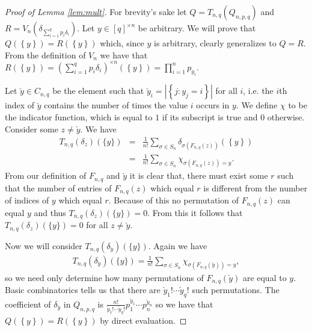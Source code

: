 \documentclass[aos,preprint]{imsart}
\def\l{\left}
\def\r{\right}
\theoremstyle{plain}
\theoremstyle{defintion}
\begin{document}
\begin{proof}[Proof of Lemma \ref{lem:mult}]
	For brevity's sake let $Q =T_{n,q}\left( Q_{n,p,q} \right)$ and  $R= V_n\left( \delta_{\sum_{i=1}^q p_i \delta_i} \right)$. Let $y \in \left[ q \right]^{\times n}$ be arbitrary. We will prove that $Q(\l\{y\r\}) = R(\l\{y\r\})$ which, since $y$ is arbitrary, clearly generalizes to $Q=R$. From the definition of $V_n$ we have that $R(\l\{y\r\}) = \left( \sum_{i=1}^q p_i \delta_i \right)^{\times n} \left( \left\{ y \right\} \right) = \prod_{i=1}^n p_{y_i}$.

	Let $\check{y}\in C_{n,q}$ be the element such that $\check{y}_i = \l|\left\{ j:y_j = i \right\}\r|$ for all $i$, i.e. the $i$th index of $\check{y}$ contains the number of times the value $i$ occurs in $y$. We define $\chi$ to be the indicator function, which is equal to $1$ if its subscript is true and $0$ otherwise. Consider some $z\neq \check{y}$. We have
	\begin{eqnarray*}
		T_{n,q}\left( \delta_z \right)(\{y\}) 
		&=& \frac{1}{n!} \sum_{\sigma \in S_n} \delta_{ \sigma\l(F_{n,q}(z)\r)}\left( \left\{ y \right\} \right)\\
		&=& \frac{1}{n!} \sum_{\sigma \in S_n}  \chi_{\sigma\l(F_{n,q}(z)\r)= y}.
	\end{eqnarray*}
	From our definition of $F_{n,q}$ and $\check{y}$ it is clear that, there must exist some $r$ such that the number of entries of $F_{n,q}(z)$ which equal $r$ is different from the number of indices of $y$ which equal $r$. Because of this no permutation of $F_{n,q}(z)$ can equal $y$ and thus $T_{n,q}\left( \delta_z \right)(\{y\}) = 0$. From this it follows that $T_{n,q}\left( \delta_z \right)(\{y\}) = 0$ for all $z\neq \check{y}$.

	Now we will consider $T_{n,q}\left( \delta_{\check{y}} \right)(\{y\})$. Again we have
	\begin{eqnarray*}
		T_{n,q}\left( \delta_{\check{y}} \right)(\{y\}) =  \frac{1}{n!} \sum_{\sigma \in S_n}  \chi_{\sigma\l(F_{n,q}(\check{y})\r)= y},
	\end{eqnarray*}
	so we need only determine how many permutations of $F_{n,q}\left( \check{y} \right)$ are equal to $y$. Basic combinatorics tells us that there are $\check{y}_1!\cdots \check{y}_q!$ such permutations. The coefficient of $\delta_{\check{y}}$ in $Q_{n,p,q}$ is $\frac{n!}{\check{y}_1! \cdots \check{y}_q!} p_1^{\check{y}_1}\cdots p_n^{\check{y}_n}$ so we have that $Q(\l\{y\r\}) = R(\l\{y\r\})$ by direct evaluation.
\end{proof}
\end{document}

